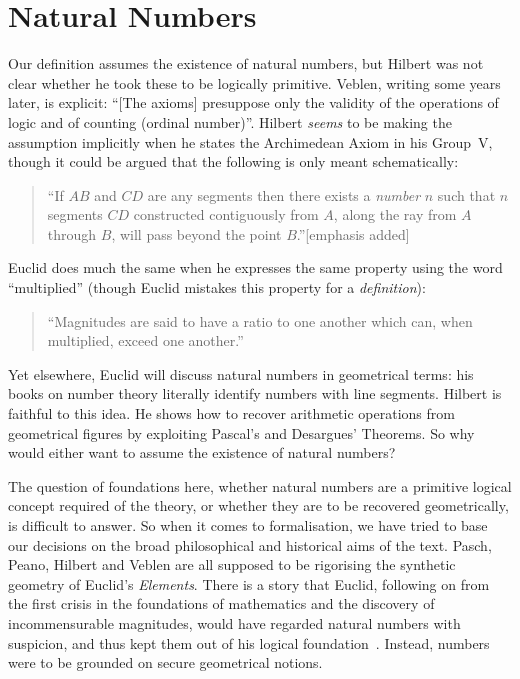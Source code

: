 \section{Natural Numbers}
Our definition assumes the existence of natural numbers, but Hilbert was not clear whether he took these to be logically primitive. Veblen, writing some years later, is explicit: ``[The axioms] presuppose only the validity of the operations of logic and of counting (ordinal number)''. Hilbert \emph{seems} to be making the assumption implicitly when he states the Archimedean Axiom in his Group~V, though it could be argued that the following is only meant schematically:
\begin{quote}
  ``If $AB$ and $CD$ are any segments then there exists a \emph{number} $n$ such that $n$ segments $CD$ constructed contiguously from $A$, along the ray from $A$ through $B$, will pass beyond the point $B$.''[emphasis added]
\end{quote}

Euclid does much the same when he expresses the same property using the word ``multiplied'' (though Euclid mistakes this property for a \emph{definition}):
\begin{quote}
  ``Magnitudes are said to have a ratio to one another which can, when multiplied, exceed one another.''
\end{quote}

Yet elsewhere, Euclid will discuss natural numbers in geometrical terms: his books on number theory literally identify numbers with line segments. Hilbert is faithful to this idea. He shows how to recover arithmetic operations from geometrical figures by exploiting Pascal's and Desargues' Theorems. So why would either want to assume the existence of natural numbers?

The question of foundations here, whether natural numbers are a primitive logical concept required of the theory, or whether they are to be recovered geometrically, is difficult to answer. So when it comes to formalisation, we have tried to base our decisions on the broad philosophical and historical aims of the text. Pasch, Peano, Hilbert and Veblen are all supposed to be rigorising the synthetic geometry of Euclid's \emph{Elements}. There is a story that Euclid, following on from the first crisis in the foundations of mathematics and the discovery of incommensurable magnitudes, would have regarded natural numbers with suspicion, and thus kept them out of his logical foundation~\cite{EvolutionEuclideanElements}. Instead, numbers were to be grounded on secure geometrical notions.

